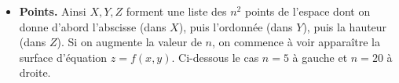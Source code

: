 \documentclass[11pt,class=report,crop=false]{standalone}
\begin{document}
\begin{itemize}
\begin{itemize}
    \item Enfin  calcule les valeurs $z = f(x,y)$ pour tous les éléments de $(x,y)$ de la grille et renvoie un tableau des valeurs.  
\begin{center}
\begin{minipage}{0.45\textwidth}
Tableau 
\begin{center}
\begin{lstlisting}
[[0.   0.25 1.   2.25 4.  ]
 [0.25 0.5  1.25 2.5  4.25]
 [1.   1.25 2.   3.25 5.  ]
 [2.25 2.5  3.25 4.5  6.25]
 [4.   4.25 5.   6.25 8.  ]]
\end{lstlisting}
\end{center}
\end{minipage}  
\end{center}    
  
    
  \end{itemize}
  
  \item \textbf{Points.} Ainsi $X,Y,Z$ forment une liste des $n^2$ points de l'espace dont on donne d'abord l'abscisse (dans $X$), puis l'ordonnée (dans $Y$), puis la hauteur (dans $Z$).
  Si on augmente la valeur de $n$, on commence à voir apparaître la surface d'équation $z=f(x,y)$. Ci-dessous le cas $n=5$ à gauche et $n=20$ à droite.
  

\end{itemize}
\end{document}
